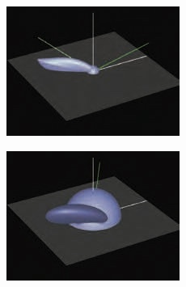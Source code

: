 \begin{figure}
\begin{center}
\begin{subfigure}[b]{0.325\textwidth}
	\end{subfigure}
	\begin{subfigure}[b]{0.325\textwidth}
		\includegraphics[width=1.\textwidth]{graphics/gi/ray-optics-8-3}
	\end{subfigure}
	\begin{subfigure}[b]{0.325\textwidth}
		\includegraphics[width=1.\textwidth]{graphics/gi/ray-optics-8-4}
	\end{subfigure}
	\begin{subfigure}[b]{0.325\textwidth}

\end{subfigure}
\end{center}
\end{figure}
